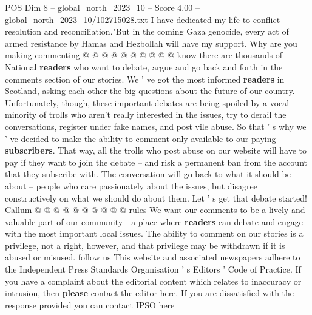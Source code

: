 \begin{textsample}{POS Dim 8 – global\_north\_2023\_10 – Score 4.00 – global\_north\_2023\_10/102715028.txt}
I have dedicated my life to conflict resolution and reconciliation."But in the coming Gaza genocide, every act of armed resistance by Hamas and Hezbollah will have my support.
Why are you making commenting @ @ @ @ @ @ @ @ @ @ know there are thousands of National \textbf{readers} who want to debate, argue and go back and forth in the comments section of our stories.
We ' ve got the most informed \textbf{readers} in Scotland, asking each other the big questions about the future of our country.
Unfortunately, though, these important debates are being spoiled by a vocal minority of trolls who aren't really interested in the issues, try to derail the conversations, register under fake names, and post vile abuse.
So that ' s why we ' ve decided to make the ability to comment only available to our paying \textbf{subscribers}.
That way, all the trolls who post abuse on our website will have to pay if they want to join the debate -- and risk a permanent ban from the account that they subscribe with.
The conversation will go back to what it should be about -- people who care passionately about the issues, but disagree constructively on what we should do about them.
Let ' s get that debate started!
Callum @ @ @ @ @ @ @ @ @ @ rules We want our comments to be a lively and valuable part of our community - a place where \textbf{readers} can debate and engage with the most important local issues.
The ability to comment on our stories is a privilege, not a right, however, and that privilege may be withdrawn if it is abused or misused. follow us This website and associated newspapers adhere to the Independent Press Standards Organisation ' s Editors ' Code of Practice.
If you have a complaint about the editorial content which relates to inaccuracy or intrusion, then \textbf{please} contact the editor here.
If you are dissatisfied with the response provided you can contact IPSO here

\end{textsample}
